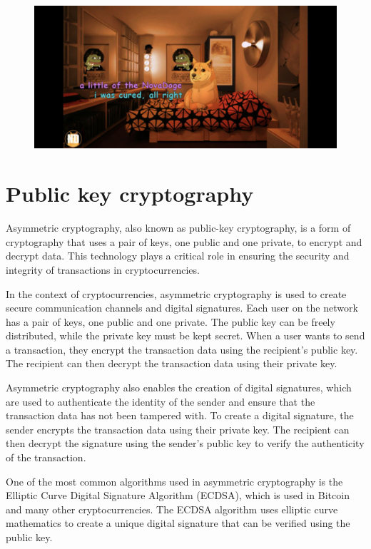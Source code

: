 \documentclass[a4paper, 10pt]{article}
\begin{document}
\begin{figure}[!h]
\centering
\includegraphics[width=0.75\linewidth]{14.jpg}
\end{figure}

\section{Public key cryptography}\label{Public key cryptography}

Asymmetric cryptography, also known as public-key cryptography, is a form of cryptography that uses a pair of keys, one public and one private, to encrypt and decrypt data. This technology plays a critical role in ensuring the security and integrity of transactions in cryptocurrencies.

In the context of cryptocurrencies, asymmetric cryptography is used to create secure communication channels and digital signatures. Each user on the network has a pair of keys, one public and one private. The public key can be freely distributed, while the private key must be kept secret. When a user wants to send a transaction, they encrypt the transaction data using the recipient's public key. The recipient can then decrypt the transaction data using their private key.

Asymmetric cryptography also enables the creation of digital signatures, which are used to authenticate the identity of the sender and ensure that the transaction data has not been tampered with. To create a digital signature, the sender encrypts the transaction data using their private key. The recipient can then decrypt the signature using the sender's public key to verify the authenticity of the transaction.

One of the most common algorithms used in asymmetric cryptography is the Elliptic Curve Digital Signature Algorithm (ECDSA), which is used in Bitcoin and many other cryptocurrencies. The ECDSA algorithm uses elliptic curve mathematics to create a unique digital signature that can be verified using the public key.
\end{document}
